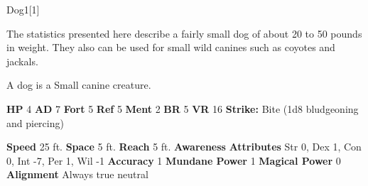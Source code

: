   
  \begin{monsection}{Dog}{1}[1]
    \vspace{-1em}\vspace{-1em}
    \vspace{0em}

    
     The statistics presented here describe a fairly small dog of about 20 to 50 pounds in weight.
     They also can be used for small wild canines such as coyotes and jackals.
    
        A dog is a Small canine creature.
      

    \begin{spellcontent}
      \begin{spelltargetinginfo}
        \pari \textbf{HP} 4 \monsep
          \textbf{AD} 7 \monsep
          \textbf{Fort} 5 \monsep
          \textbf{Ref} 5 \monsep
          \textbf{Ment} 2
        \pari \textbf{BR} 5 \monsep
        \textbf{VR} 16
        \pari \textbf{Strike:}
            Bite  (1d8 bludgeoning and piercing)
      \end{spelltargetinginfo}
    \end{spellcontent}
    \begin{monsterfooter}
      \pari \textbf{Speed} 25 ft. \monsep
        \textbf{Space} 5 ft. \monsep
        \textbf{Reach} 5 ft.
      \pari \textbf{Awareness} 
      \pari \textbf{Attributes}
        Str 0, Dex 1,
        Con 0, Int -7,
        Per 1, Wil -1
      \pari \textbf{Accuracy} 1 \monsep
        \textbf{Mundane Power} 1 \monsep
      \textbf{Magical Power} 0
      \pari \textbf{Alignment} Always true neutral
    \end{monsterfooter}
  \end{monsection}
  
